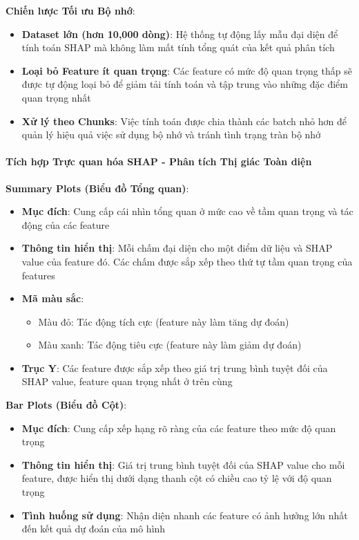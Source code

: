 \textbf{Chiến lược Tối ưu Bộ nhớ}:
\begin{itemize}[leftmargin=*]
    \item \textbf{Dataset lớn (hơn 10,000 dòng)}: Hệ thống tự động lấy mẫu đại diện để tính toán SHAP mà không làm mất tính tổng quát của kết quả phân tích
    
    \item \textbf{Loại bỏ Feature ít quan trọng}: Các feature có mức độ quan trọng thấp sẽ được tự động loại bỏ để giảm tải tính toán và tập trung vào những đặc điểm quan trọng nhất
    
    \item \textbf{Xử lý theo Chunks}: Việc tính toán được chia thành các batch nhỏ hơn để quản lý hiệu quả việc sử dụng bộ nhớ và tránh tình trạng tràn bộ nhớ
\end{itemize}

\paragraph{Tích hợp Trực quan hóa SHAP - Phân tích Thị giác Toàn diện}

\textbf{Summary Plots (Biểu đồ Tổng quan)}:
\begin{itemize}[leftmargin=*]
    \item \textbf{Mục đích}: Cung cấp cái nhìn tổng quan ở mức cao về tầm quan trọng và tác động của các feature
    
    \item \textbf{Thông tin hiển thị}: Mỗi chấm đại diện cho một điểm dữ liệu và SHAP value của feature đó. Các chấm được sắp xếp theo thứ tự tầm quan trọng của features
    
    \item \textbf{Mã màu sắc}: 
    \begin{itemize}[leftmargin=*]
        \item Màu đỏ: Tác động tích cực (feature này làm tăng dự đoán)
        \item Màu xanh: Tác động tiêu cực (feature này làm giảm dự đoán)
    \end{itemize}
    
    \item \textbf{Trục Y}: Các feature được sắp xếp theo giá trị trung bình tuyệt đối của SHAP value, feature quan trọng nhất ở trên cùng
\end{itemize}

\textbf{Bar Plots (Biểu đồ Cột)}:
\begin{itemize}[leftmargin=*]
    \item \textbf{Mục đích}: Cung cấp xếp hạng rõ ràng của các feature theo mức độ quan trọng
    
    \item \textbf{Thông tin hiển thị}: Giá trị trung bình tuyệt đối của SHAP value cho mỗi feature, được hiển thị dưới dạng thanh cột có chiều cao tỷ lệ với độ quan trọng
    
    \item \textbf{Tình huống sử dụng}: Nhận diện nhanh các feature có ảnh hưởng lớn nhất đến kết quả dự đoán của mô hình
\end{itemize}

